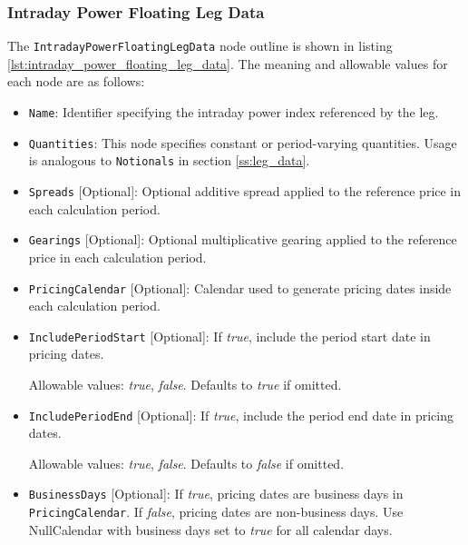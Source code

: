 \subsubsection{Intraday Power Floating Leg Data}
\label{ss:intraday_power_floating_leg_data}

The \lstinline!IntradayPowerFloatingLegData! node outline is shown in listing \ref{lst:intraday_power_floating_leg_data}. The meaning and allowable values for each node are as follows:

\begin{itemize}

\item
\lstinline!Name!: Identifier specifying the intraday power index referenced by the leg.

\item
\lstinline!Quantities!: This node specifies constant or period-varying quantities. Usage is analogous to \lstinline!Notionals! in section \ref{ss:leg_data}.

\item
\lstinline!Spreads! [Optional]: Optional additive spread applied to the reference price in each calculation period.

\item
\lstinline!Gearings! [Optional]: Optional multiplicative gearing applied to the reference price in each calculation period.

\item
\lstinline!PricingCalendar! [Optional]: Calendar used to generate pricing dates inside each calculation period.

\item
\lstinline!IncludePeriodStart! [Optional]: If \emph{true}, include the period start date in pricing dates.

Allowable values: \emph{true}, \emph{false}. Defaults to \emph{true} if omitted.

\item
\lstinline!IncludePeriodEnd! [Optional]: If \emph{true}, include the period end date in pricing dates.

Allowable values: \emph{true}, \emph{false}. Defaults to \emph{false} if omitted.

\item
\lstinline!BusinessDays! [Optional]: If \emph{true}, pricing dates are business days in \lstinline!PricingCalendar!. If \emph{false}, pricing dates are non-business days. 
Use NullCalendar with business days set to \emph{true} for all calendar days.


\end{itemize}

